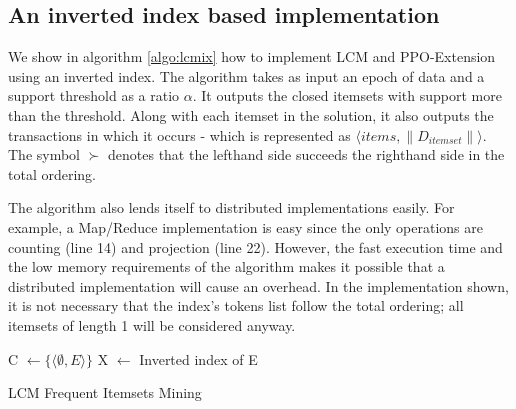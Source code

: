 \documentclass{sig-alternate}
\begin{document}
\subsection{An inverted index based implementation}
We show in algorithm \ref{algo:lcmix} how to implement LCM and PPO-Extension using an inverted index. The algorithm takes as input an epoch of data and a support threshold as a ratio $\alpha$. It outputs the closed itemsets with support more than the threshold. Along with each itemset in the solution, it also outputs the transactions in which it occurs - which is represented as $\langle items, \|D_{itemset}\| \rangle$. The symbol $\succ$ denotes that the lefthand side  succeeds the righthand side in the total ordering.

The algorithm also lends itself to distributed implementations easily. For example, a Map/Reduce implementation is easy since the only operations are counting (line 14) and projection (line 22). However, the fast execution time and the low memory requirements of the algorithm makes it possible that a distributed implementation will cause an overhead. In the implementation shown, it is not necessary that the index's tokens list follow the total ordering; all itemsets of length 1 will be considered anyway. 

\begin{algorithm}
\SetAlgoLined
\LinesNumbered
{}

C $\gets \{\langle \emptyset, E\rangle\}$ 
X $\gets$ Inverted index of E\;
\;


\caption{LCM Frequent Itemsets Mining}
\label{algo:lcmix}


\end{algorithm}
\end{document}
